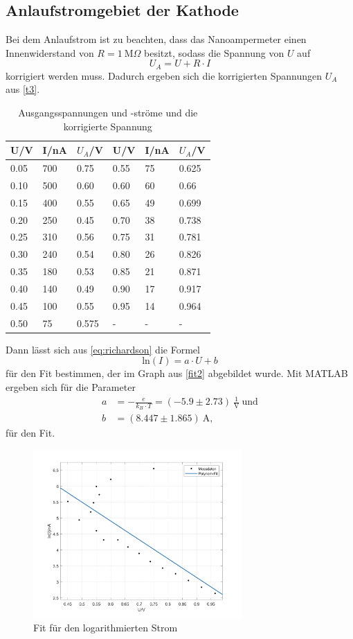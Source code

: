  \subsection{Anlaufstromgebiet der Kathode}
 \label{sec:t1}
 Bei dem Anlaufstrom ist zu beachten, dass das Nanoampermeter einen Innenwiderstand von $R=1\ \textrm{M}\Omega$ besitzt, sodass die Spannung von $U$ auf
 \begin{equation*}
   U_{A}=U+R\cdot I
 \end{equation*}
 korrigiert werden muss. Dadurch ergeben sich die korrigierten Spannungen $U_{A}$ aus \autoref{t3}.
 \begin{table}[H]
 \centering
 \caption{Ausgangsspannungen und -ströme und die korrigierte Spannung}
 \begin{tabular}{l|l|l|l|l|l}
 U/V & I/nA & $U_{A}$/V & U/V & I/nA & $U_{A}$/V\\\hline
 0.05 & 700 & 0.75 & 0.55 & 75 & 0.625\\
 0.10 & 500 & 0.60 & 0.60 & 60 & 0.66\\
 0.15 & 400 & 0.55 & 0.65 & 49 & 0.699\\
 0.20 & 250 & 0.45 & 0.70 & 38 & 0.738\\
 0.25 & 310 & 0.56 & 0.75 & 31 & 0.781\\
 0.30 & 240 & 0.54 & 0.80 & 26 & 0.826\\
 0.35 & 180 & 0.53 & 0.85 & 21 & 0.871\\
 0.40 & 140 & 0.49 & 0.90 & 17 & 0.917\\
 0.45 & 100 & 0.55 & 0.95 & 14 & 0.964\\
 0.50 & 75 & 0.575 & - & - & -\\\hline
 \end{tabular}
 \label{t3}
 \end{table}
 Dann lässt sich aus \eqref{eq:richardson} die Formel 
 \begin{equation*}
   \textrm{ln}(I)=a\cdot U+b
 \end{equation*}
 für den Fit bestimmen, der im Graph aus \autoref{fit2} abgebildet wurde. Mit MATLAB ergeben sich für die Parameter
 \begin{align*}
   a&=-\frac{e}{k_{B}\cdot T}=(-5.9 \pm 2.73)\ \frac{1}{\textrm{V}}\ \textrm{und}\\
   b&=(8.447 \pm 1.865)\ \textrm{A},
 \end{align*}
 für den Fit.
 \begin{figure}[H]
 \centering
 \includegraphics[width=8cm]{linfit.png}
 \caption{Fit für den logarithmierten Strom}
 \label{fit2}
 \end{figure}
